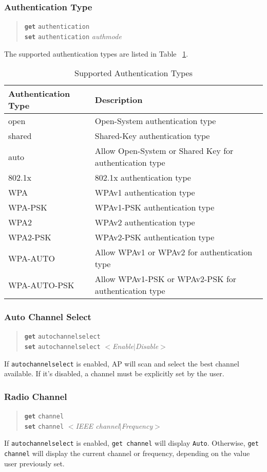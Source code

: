 \documentclass[10pt,fullpage]{article}
\newcommand{\mytt}[1]{{\texttt{#1}}}
\newcommand{\bv}{\begin{verse}}
\newcommand{\ev}{\end{verse}}
\newcommand{\clicmd}[1]{{\textbf{\texttt{#1}}}}
\newcommand{\cliparam}[1]{{\texttt{#1}}}
\newcommand{\clival}[1]{{\emph{#1}}}
\begin{document}
\subsubsection{Authentication Type}
\bv
\clicmd{get} \cliparam{authentication}\\
\clicmd{set} \cliparam{authentication} \clival{authmode}
\ev
The supported authentication types are listed in Table ~\ref{tab:auth}.
\begin{table}[h*]
  \centering
  \begin{tabular}{|l|l|} \hline
    Authentication Type & Description \\ \hline
    open & Open-System authentication type \\
    shared & Shared-Key authentication type \\
    auto & Allow Open-System or Shared Key for authentication type \\
    802.1x & 802.1x authentication type \\
    WPA  & WPAv1 authentication type \\
    WPA-PSK & WPAv1-PSK authentication type \\
    WPA2 & WPAv2 authentication type \\
    WPA2-PSK & WPAv2-PSK authentication type \\
    WPA-AUTO & Allow WPAv1 or WPAv2 for authentication type \\
    WPA-AUTO-PSK & Allow WPAv1-PSK or WPAv2-PSK for authentication type \\ \hline
  \end{tabular}
  \caption{Supported Authentication Types}
  \label{tab:auth}
\end{table}

\subsubsection{Auto Channel Select}
\bv
\clicmd{get} \cliparam{autochannelselect}\\
\clicmd{set} \cliparam{autochannelselect} $<$\clival{Enable}$|$\clival{Disable}$>$
\ev
If \cliparam{autochannelselect} is enabled, AP will scan and select the best channel
available. If it's disabled, a channel must be explicitly set by the user.

\subsubsection{Radio Channel}
\bv
\clicmd{get} \cliparam{channel}\\
\clicmd{set} \cliparam{channel} $<$\clival{IEEE channel}$|$\clival{Frequency}$>$
\ev
If \cliparam{autochannelselect} is enabled, \mytt{get channel} will display 
\mytt{Auto}. Otherwise, \mytt{get channel} will display the current channel or frequency, 
depending on the value user previously set.
\end{document}
